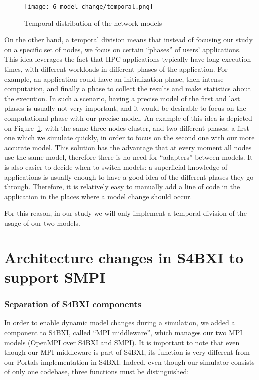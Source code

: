 \begin{figure}[!ht]
    \centering
    \texttt{[image: 6\_model\_change/temporal.png]}
    \caption{Temporal distribution of the network models}
    \label{fig:6_model_change:temporal}
\end{figure}

On the other hand, a temporal division means that instead of focusing our study
on a specific set of nodes, we focus on certain ``phases'' of users'
applications. This idea leverages the fact that HPC applications typically have
long execution times, with different workloads in different phases of the
application. For example, an application could have an initialization phase,
then intense computation, and finally a phase to collect the results and make
statistics about the execution. In such a scenario, having a precise model of
the first and last phases is usually not very important, and it would be
desirable to focus on the computational phase with our precise model. An example
of this idea is depicted on Figure~\ref{fig:6_model_change:temporal}, with the
same three-nodes cluster, and two different phases: a first one which we
simulate quickly, in order to focus on the second one with our more accurate
model. This solution has the advantage that at every moment all nodes use the
same model, therefore there is no need for ``adapters'' between models. It is
also easier to decide when to switch models: a superficial knowledge of
applications is usually enough to have a good idea of the different phases they
go through. Therefore, it is relatively easy to manually add a line of code in
the application in the places where a model change should occur.

For this reason, in our study we will only implement a temporal division of the
usage of our two models.

\section{Architecture changes in S4BXI to support SMPI}
\label{sec:6_model_change:model_change_arch}

\subsubsection{Separation of S4BXI components}

In order to enable dynamic model changes during a simulation, we added a
component to S4BXI, called ``MPI middleware'', which manages our two MPI models
(OpenMPI over S4BXI and SMPI). It is important to note that even though our MPI
middleware is part of S4BXI, its function is very different from our Portals
implementation in S4BXI. Indeed, even though our simulator consists of only one
codebase, three functions must be distinguished:

